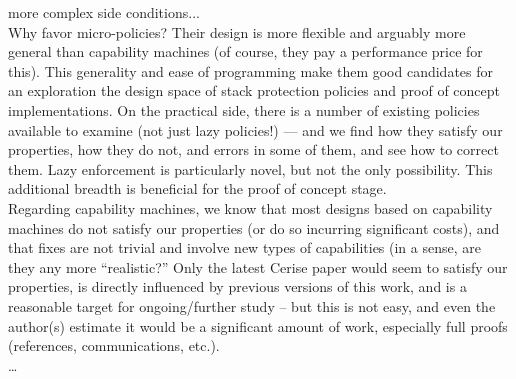 {more complex side conditions...
%
\\
%
Why favor micro-policies? Their design is more flexible and arguably more
general than capability machines (of course, they pay a performance price for
this). This generality and ease of programming make them good candidates for an
exploration the design space of stack protection policies and proof of concept
implementations. On the practical side, there is a number of existing policies
available to examine (not just lazy policies!) --- and we find how they satisfy
our properties, how they do not, and errors in some of them, and see how to
correct them. Lazy enforcement is particularly novel, but not the only
possibility. This additional breadth is beneficial for the proof of concept
stage.
%
\\
%
Regarding capability machines, we know that most designs based on capability
machines do not satisfy our properties (or do so incurring significant costs),
and that fixes are not trivial and involve new types of capabilities (in a
sense, are they any more ``realistic?'' Only the latest Cerise paper would seem
to satisfy our properties, is directly influenced by previous versions of this
work, and is a reasonable target for ongoing/further study -- but this is not
easy, and even the author(s) estimate it would be a significant amount of work,
especially full proofs (references, communications, etc.).
%
\\
%
\ldots
%
}



